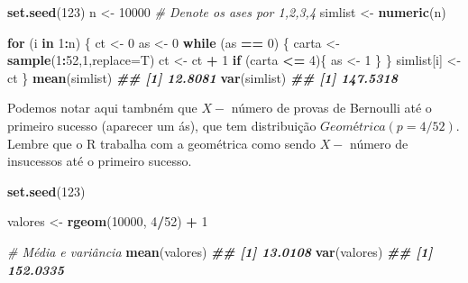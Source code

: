 \documentclass[
]{book}
\newenvironment{Shaded}{\begin{snugshade}}{\end{snugshade}}
\newcommand{\AttributeTok}[1]{\textcolor[rgb]{0.13,0.29,0.53}{#1}}
\newcommand{\CommentTok}[1]{\textcolor[rgb]{0.56,0.35,0.01}{\textit{#1}}}
\newcommand{\ControlFlowTok}[1]{\textcolor[rgb]{0.13,0.29,0.53}{\textbf{#1}}}
\newcommand{\DecValTok}[1]{\textcolor[rgb]{0.00,0.00,0.81}{#1}}
\newcommand{\DocumentationTok}[1]{\textcolor[rgb]{0.56,0.35,0.01}{\textbf{\textit{#1}}}}
\newcommand{\FunctionTok}[1]{\textcolor[rgb]{0.13,0.29,0.53}{\textbf{#1}}}
\newcommand{\NormalTok}[1]{#1}
\newcommand{\OtherTok}[1]{\textcolor[rgb]{0.56,0.35,0.01}{#1}}
\newcommand{\SpecialCharTok}[1]{\textcolor[rgb]{0.81,0.36,0.00}{\textbf{#1}}}
\begin{document}
\begin{Shaded}
\begin{Highlighting}[]
\FunctionTok{set.seed}\NormalTok{(}\DecValTok{123}\NormalTok{)}
\NormalTok{n }\OtherTok{\textless{}{-}} \DecValTok{10000}
\CommentTok{\# Denote os ases por 1,2,3,4 }
\NormalTok{simlist }\OtherTok{\textless{}{-}} \FunctionTok{numeric}\NormalTok{(n)}

\ControlFlowTok{for}\NormalTok{ (i }\ControlFlowTok{in} \DecValTok{1}\SpecialCharTok{:}\NormalTok{n) \{}
\NormalTok{  ct }\OtherTok{\textless{}{-}} \DecValTok{0}
\NormalTok{  as }\OtherTok{\textless{}{-}} \DecValTok{0}
  \ControlFlowTok{while}\NormalTok{ (as }\SpecialCharTok{==} \DecValTok{0}\NormalTok{) \{}
\NormalTok{    carta }\OtherTok{\textless{}{-}} \FunctionTok{sample}\NormalTok{(}\DecValTok{1}\SpecialCharTok{:}\DecValTok{52}\NormalTok{,}\DecValTok{1}\NormalTok{,}\AttributeTok{replace=}\NormalTok{T)}
\NormalTok{    ct }\OtherTok{\textless{}{-}}\NormalTok{ ct }\SpecialCharTok{+} \DecValTok{1}
    \ControlFlowTok{if}\NormalTok{ (carta }\SpecialCharTok{\textless{}=} \DecValTok{4}\NormalTok{)\{}
\NormalTok{      as }\OtherTok{\textless{}{-}} \DecValTok{1}
\NormalTok{    \}}
\NormalTok{  \}}
\NormalTok{  simlist[i] }\OtherTok{\textless{}{-}}\NormalTok{ ct}
\NormalTok{\}}
\FunctionTok{mean}\NormalTok{(simlist)}
\DocumentationTok{\#\# [1] 12.8081}
\FunctionTok{var}\NormalTok{(simlist)}
\DocumentationTok{\#\# [1] 147.5318}
\end{Highlighting}
\end{Shaded}

Podemos notar aqui tambném que \(X-\) número de provas de Bernoulli até o
primeiro sucesso (aparecer um ás), que tem distribuição
\(Geométrica(p=4/52)\). Lembre que o R trabalha com a geométrica como
sendo \(X-\) número de insucessos até o primeiro sucesso.

\begin{Shaded}
\begin{Highlighting}[]
\FunctionTok{set.seed}\NormalTok{(}\DecValTok{123}\NormalTok{)}

\NormalTok{valores }\OtherTok{\textless{}{-}} \FunctionTok{rgeom}\NormalTok{(}\DecValTok{10000}\NormalTok{, }\DecValTok{4}\SpecialCharTok{/}\DecValTok{52}\NormalTok{) }\SpecialCharTok{+} \DecValTok{1}

\CommentTok{\# Média e variância}
\FunctionTok{mean}\NormalTok{(valores)}
\DocumentationTok{\#\# [1] 13.0108}
\FunctionTok{var}\NormalTok{(valores)}
\DocumentationTok{\#\# [1] 152.0335}
\end{Highlighting}
\end{Shaded}
\end{document}
